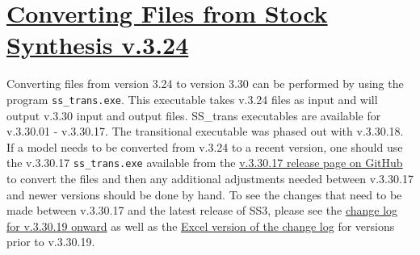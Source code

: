 \hypertarget{ConvIssues}{}
\section[Converting Files from Stock Synthesis v.3.24]{\protect\hyperlink{ConvIssues}{Converting Files from Stock Synthesis v.3.24}}
Converting files from version 3.24 to version 3.30 can be performed by using the program \texttt{ss\_trans.exe}. This executable takes v.3.24 files as input and will output v.3.30 input and output files. SS\_trans executables are available for v.3.30.01 - v.3.30.17. The transitional executable was phased out with v.3.30.18. If a model needs to be converted from v.3.24 to a recent version, one should use the v.3.30.17 \texttt{ss\_trans.exe} available from the \href{https://github.com/nmfs-ost/ss3-source-code/releases/tag/v3.30.17}{v.3.30.17 release page on GitHub} to convert the files and then any additional adjustments needed between v.3.30.17 and newer versions should be done by hand.  To see the changes that need to be made between v.3.30.17 and the latest release of SS3, please see the \href{https://github.com/orgs/nmfs-ost/projects/11}{change log for v.3.30.19 onward} as well as the \href{https://github.com/nmfs-ost/ss3-source-code/blob/v3.30.19/Change_log_for_SS_3.30.xlsx?raw=true}{Excel version of the change log} for versions prior to v.3.30.19.

